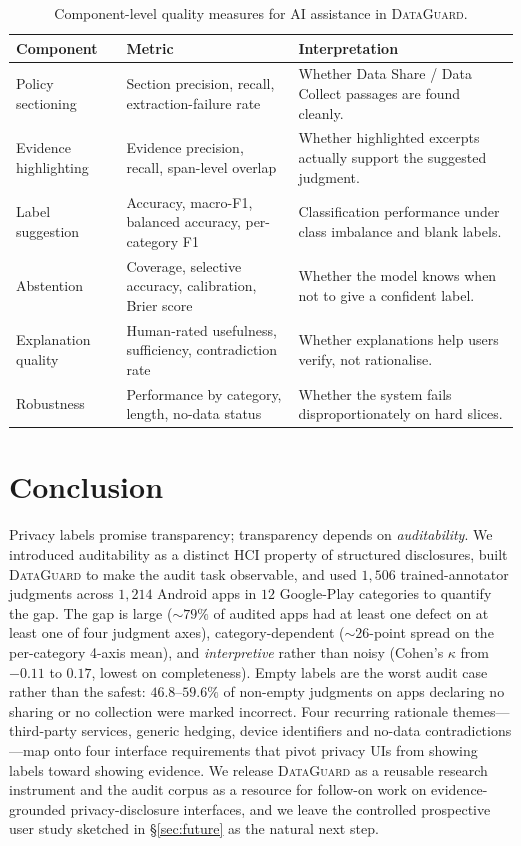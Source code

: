 \documentclass[11pt,a4paper]{article}
\newcommand{\dataguard}{\textsc{DataGuard}}
\begin{document}
\begin{table}[t]
\centering\small
\caption{Component-level quality measures for AI assistance in
\dataguard{}.}
\label{tab:ai-quality}
\begin{tabular}{p{}p{}p{}}
\toprule
Component & Metric & Interpretation \\
\midrule
Policy sectioning &
Section precision, recall, extraction-failure rate &
Whether Data Share / Data Collect passages are found cleanly. \\[2pt]
Evidence highlighting &
Evidence precision, recall, span-level overlap &
Whether highlighted excerpts actually support the suggested judgment. \\[2pt]
Label suggestion &
Accuracy, macro-F1, balanced accuracy, per-category F1 &
Classification performance under class imbalance and blank labels. \\[2pt]
Abstention &
Coverage, selective accuracy, calibration, Brier score &
Whether the model knows when not to give a confident label. \\[2pt]
Explanation quality &
Human-rated usefulness, sufficiency, contradiction rate &
Whether explanations help users verify, not rationalise. \\[2pt]
Robustness &
Performance by category, length, no-data status &
Whether the system fails disproportionately on hard slices. \\
\bottomrule
\end{tabular}
\end{table}

\section{Conclusion}
\label{sec:conclusion}
Privacy labels promise transparency; transparency depends on
\emph{auditability}. We introduced auditability as a distinct HCI
property of structured disclosures, built \dataguard{} to make the
audit task observable, and used $1{,}506$ trained-annotator judgments
across $1{,}214$ Android apps in $12$ Google-Play categories to
quantify the gap. The gap is large ($\sim 79\%$ of audited apps had
at least one defect on at least one of four judgment axes),
category-dependent ($\sim 26$-point spread on the per-category 4-axis
mean), and \emph{interpretive} rather than noisy (Cohen's $\kappa$
from $-0.11$ to $0.17$, lowest on completeness). Empty labels are the
worst audit case rather than the safest: $46.8$--$59.6\%$ of non-empty
judgments on apps declaring no sharing or no collection were marked
incorrect. Four recurring rationale themes---third-party services,
generic hedging, device identifiers and no-data contradictions---map
onto four interface requirements that pivot privacy UIs from showing
labels toward showing evidence. We release \dataguard{} as a reusable
research instrument and the audit corpus as a resource for follow-on
work on evidence-grounded privacy-disclosure interfaces, and we leave
the controlled prospective user study sketched in \S\ref{sec:future}
as the natural next step.
\end{document}
